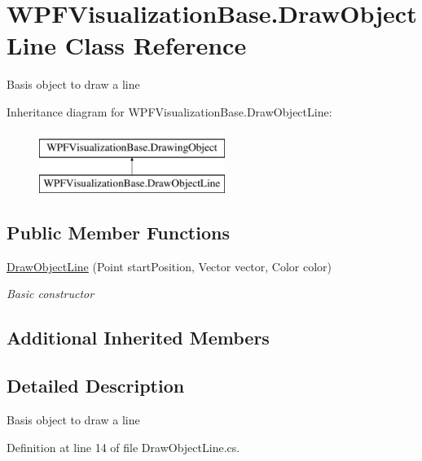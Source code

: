 \hypertarget{class_w_p_f_visualization_base_1_1_draw_object_line}{}\section{W\+P\+F\+Visualization\+Base.\+Draw\+Object\+Line Class Reference}
\label{class_w_p_f_visualization_base_1_1_draw_object_line}


Basis object to draw a line  


Inheritance diagram for W\+P\+F\+Visualization\+Base.\+Draw\+Object\+Line\+:\begin{figure}[H]
\begin{center}
\leavevmode
\includegraphics[height=2.000000cm]{class_w_p_f_visualization_base_1_1_draw_object_line}
\end{center}
\end{figure}
\subsection*{Public Member Functions}
\begin{DoxyCompactItemize}
\item 
\hyperlink{class_w_p_f_visualization_base_1_1_draw_object_line_a1325699d57c28775eb629d29ada49ea6}{Draw\+Object\+Line} (Point start\+Position, Vector vector, Color color)
\begin{DoxyCompactList}\small\item\em Basic constructor \end{DoxyCompactList}\end{DoxyCompactItemize}
\subsection*{Additional Inherited Members}


\subsection{Detailed Description}
Basis object to draw a line 



Definition at line 14 of file Draw\+Object\+Line.\+cs.



